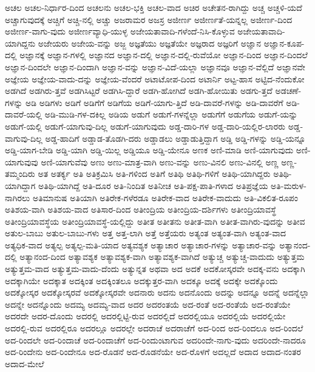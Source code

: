 {ಅಚಲ
ಅಚಲ-ನಿರ್ಧಾರ-ದಿಂದ
ಅಚಲನು
ಅಚಲ-ಭಕ್ತಿ
ಅಚಲ-ವಾದ
ಅಚಿರ
ಅಚೇತನ-ರಾಗಿದ್ದು
ಅಚ್ಚ
ಅಚ್ಚಳಿ-ಯದೆ
ಅಚ್ಚಾಗುವುದಕ್ಕೆ
ಅಚ್ಚಿಗೆ
ಅಚ್ಚಿ-ನಲ್ಲಿ
ಅಚ್ಚು
ಅಜರಾಮರ
ಅಜಸ್ರ
ಅಜೀರ್ಣ
ಅಜೀರ್ಣತೆ-ಯನ್ನಲ್ಲ
ಅಜೀರ್ಣ-ದಿಂದ
ಅಜೀರ್ಣ-ವಾಗು-ವುದು
ಅಜೀರ್ಣವ್ಯಾಧಿ-ಯುಳ್ಳ
ಅಜೇಯತಾವಾದಿ-ಗಳೆಂದೆ-ನಿಸಿ-ಕೊಳ್ಳುವ
ಅಜೇಯತಾವಾದಿ-ಯಾಗಿದ್ದನು
ಅಜೇಯರು
ಅಜೇಯ-ವನ್ನು
ಅಜ್ಜ
ಅಜ್ಞತೆಯು
ಅಜ್ಞತೆಯೇ
ಅಜ್ಞರಾದ
ಅಜ್ಞರಿಗೆ
ಅಜ್ಞಾನ
ಅಜ್ಞಾನ-ಕೂಪ-ದಲ್ಲಿ
ಅಜ್ಞಾನಕ್ಕೆ
ಅಜ್ಞಾನ-ಗಳಲ್ಲಿ
ಅಜ್ಞಾನದ
ಅಜ್ಞಾನ-ದಲ್ಲಿ
ಅಜ್ಞಾನ-ದಲ್ಲಿ-ರುವೆಯೋ
ಅಜ್ಞಾನ-ದಿಂದ
ಅಜ್ಞಾನ-ದಿಂದಲೆ
ಅಜ್ಞಾನ-ದಿಂದಲೇ
ಅಜ್ಞಾನ-ದಿಂದಾಗಿ
ಅಜ್ಞಾನ-ವನ್ನು
ಅಜ್ಞಾನ-ವಿದೆ-ಯಲ್ಲಾ
ಅಜ್ಞಾನವೂ
ಅಜ್ಞಾನ-ವೆಲ್ಲಿದೆ
ಅಜ್ಞಾನವೇ
ಅಜ್ಞೇಯ
ಅಜ್ಞೇಯ-ವಾದು-ದನ್ನು
ಅಜ್ಞೇಯ-ವೆಂದರೆ
ಅಟಾಟೋಪ-ದಿಂದ
ಅಟಾರ್ನಿ
ಅಟ್ಟ-ಹಾಸ
ಅಟ್ಟಿದ-ನೆಂದುಕೋ
ಅಡಗಿದೆ
ಅಡಗಿರು-ತ್ತವೆ
ಅಡಗಿಸಿಟ್ಟರೆ
ಅಡಗಿಸಿ-ದ್ದಾರೆ
ಅಡಗಿ-ಹೋಗಿದೆ
ಅಡಗಿ-ಹೋಯಿತು
ಅಡಗು-ತ್ತದೆ
ಅಡಚಣೆ-ಗಳನ್ನು
ಅಡಿ
ಅಡಿಗಳು
ಅಡಿಗೆ
ಅಡಿಗೆಗೆ
ಅಡಿಗೆಯ
ಅಡಿಗೆ-ಯಾಗು-ತ್ತಿದೆ
ಅಡಿ-ದಾವರೆ-ಗಳನ್ನು
ಅಡಿ-ದಾವರೆಗೆ
ಅಡಿ-ದಾವರೆ-ಯಲ್ಲಿ
ಅಡಿ-ಮುಡಿ-ಗಳ-ದಕಿಲ್ಲ
ಅಡಿಯ
ಅಡುಗೆ
ಅಡುಗೆ-ಗಳನ್ನೆಲ್ಲಾ
ಅಡುಗೆಗೆ
ಅಡುಗೆಯ
ಅಡುಗೆ-ಯನ್ನು
ಅಡುಗೆ-ಯಲ್ಲಿ
ಅಡುಗೆ-ಯಾಗುವು-ದಿಲ್ಲ
ಅಡುಗೆ-ಯಾಗುವುದು
ಅಡ್ಡ-ದಾರಿ-ಗಳ
ಅಡ್ಡ-ದಾರಿ-ಯಲ್ಲಿರ-ಲಾರರು
ಅಡ್ಡ-ವಾಗುವು-ದಿಲ್ಲ
ಅಡ್ಡ-ಹಾದಿಗೆ
ಅಡ್ಡಾಡ-ತೊಡಗಿ-ದರು
ಅಡ್ಡಾಡಲು
ಅಡ್ಡಾಡುತ್ತಿದ್ದಾಗ
ಅಡ್ಡಿ
ಅಡ್ಡಿ-ಗಳನ್ನು
ಅಡ್ಡಿ-ಯನ್ನೂ
ಅಡ್ಡಿ-ಯಾಗ-ಬೇಡಿ
ಅಡ್ಡಿ-ಯಾಗಿ
ಅಡ್ಡಿ-ಯಿಲ್ಲ
ಅಡ್ಡಿಯೂ
ಅಡ್ಡಿ-ಯೇನೂ
ಅಣಕ
ಅಣಿ-ಮಾಡಿ
ಅಣಿ-ಯಾಗುವುದು
ಅಣಿ-ಯಾಗುವುವು
ಅಣಿ-ಯಾಗುವೆವು
ಅಣು
ಅಣು-ಮಾತ್ರ-ವಾಗಿ
ಅಣು-ವನ್ನು
ಅಣು-ವಿನಲಿ
ಅಣು-ವಿನಲ್ಲಿ
ಅಣ್ಣ
ಅಣ್ಣ-ತಮ್ಮಂದಿರು
ಅತ
ಅತರ್ಕ್ಯ
ಅತಿ
ಅತಿಕ್ರಮಿಸಿ
ಅತಿ-ಗಳಿಂದ
ಅತಿಗೆ
ಅತಿಥಿ
ಅತಿಥಿ-ಗಳಿಗೆ
ಅತಿಥಿ-ಯಾಗಿದ್ದರು
ಅತಿಥಿ-ಯಾಗಿದ್ದಾಗ
ಅತಿಥಿ-ಯಾಗಿದ್ದೆ
ಅತಿ-ದೂರ
ಅತಿ-ನಿಂದಿತ
ಅತಿನೀಚ
ಅತಿ-ಪಕ್ಷ-ಪಾತಿ-ಗಳಾದ
ಅತಿಪ್ರಜ್ಞೆಯ
ಅತಿ-ಮರುಳ-ನಾಗಿರಲು
ಅತಿಮಾನುಷ
ಅತಿಯಾಗಿ
ಅತಿರೇಕ-ಗಳೆರಡೂ
ಅತಿರೇಕ-ವಾದ
ಅತಿರೇಕ-ವಾದುದು
ಅತಿ-ವಿಕಲಿತ-ರೂಪಂ
ಅತಿಶಯ-ವಾಗಿ
ಅತಿಶಯ-ವಾದ
ಅತಿಸಾರ-ದಿಂದ
ಅತೀಂದ್ರಿಯ
ಅತೀಂದ್ರಿಯ-ದರ್ಶಿಗಳು
ಅತೀಂದ್ರಿಯಾವಸ್ಥೆ
ಅತೀಂದ್ರಿಯಾವಸ್ಥೆಯ
ಅತೀಂದ್ರಿಯಾವಸ್ಥೆ-ಯಲ್ಲಿದ್ದು
ಅತೀತ
ಅತೀತನು
ಅತೀತ-ವಾಗಿ
ಅತೀತ-ವಾಗಿರು-ವುದನ್ನು
ಅತೀವ
ಅತುಲ-ಬಾಬು
ಅತುಲ-ಬಾಬು-ಗಳು
ಅತ್ತ
ಅತ್ತ-ಲಾಗಿ
ಅತ್ತೆ
ಅತ್ತೆಯರು
ಅತ್ಯಂತ
ಅತ್ಯಂತ-ವಾಗಿ
ಅತ್ಯಂತ-ವಾದ
ಅತ್ಯಧಿಕ-ವಾದ
ಅತ್ಯಲ್ಪ
ಅತ್ಯಲ್ಪ-ಮತಿ-ಯಾದ
ಅತ್ಯವಶ್ಯಕ
ಅತ್ಯಾಚಾರ
ಅತ್ಯಾಚಾರ-ಗಳನ್ನು
ಅತ್ಯಾಚಾರ-ವನ್ನು
ಅತ್ಯಾನಂದ-ದಲ್ಲಿ
ಅತ್ಯಾನಂದ-ದಿಂದ
ಅತ್ಯಾವಶ್ಯಕ
ಅತ್ಯಾವಶ್ಯಕ-ವಾಗಿ
ಅತ್ಯಾವಶ್ಯಕ-ವಾಗಿದೆ
ಅತ್ಯುಚ್ಚ
ಅತ್ಯುಚ್ಚ-ವಾದುದು
ಅತ್ಯುತ್ತಮ
ಅತ್ಯುತ್ತಮ-ವಾದ
ಅತ್ಯುತ್ತಮ-ವಾದು-ದೆಂದು
ಅತ್ಯುನ್ನತ
ಅಥವಾ
ಅದ
ಅದಕೆ
ಅದಕೋಸ್ಕರವೇ
ಅದಕ್ಕ-ವನು
ಅದಕ್ಕಾಗಿ
ಅದಕ್ಕಾಗಿಯೇ
ಅದಕ್ಕಾತ
ಅದಕ್ಕಿಂತ
ಅದಕ್ಕಿಂತಲೂ
ಅದಕ್ಕುತ್ತರ-ವಾಗಿ
ಅದಕ್ಕೂ
ಅದಕ್ಕೆ
ಅದಕ್ಕೇ
ಅದಕ್ಕೊಂದು
ಅದಕ್ಕೋಸ್ಕರ
ಅದಕ್ಕೋಸ್ಕರವೆ
ಅದಕ್ಕೋಸ್ಕರವೇ
ಅದನಾರು
ಅದನು
ಅದನೊಂದು
ಅದನ್ನು
ಅದನ್ನೂ
ಅದನ್ನೆ
ಅದನ್ನೆಲ್ಲಾ
ಅದನ್ನೇ
ಅದನ್ನೊಂದು
ಅದಮ್ಯ
ಅದಮ್ಯ-ವಾದ
ಅದರ
ಅದರಂತಯೆ
ಅದ-ರಂತೆ
ಅದ-ರಂತೆಯೆ
ಅದ-ರಂತೆಯೇ
ಅದರದೇ
ಅದರ-ದೊಂದು
ಅದರಲ್ಲಿ
ಅದರಲ್ಲಿಟ್ಟಿ-ರುವ
ಅದರಲ್ಲಿದೆ
ಅದರಲ್ಲಿಯೂ
ಅದರಲ್ಲಿಯೆ
ಅದರಲ್ಲಿಯೇ
ಅದರಲ್ಲಿ-ರುವ
ಅದರಲ್ಲಿರೂ
ಅದರಲ್ಲೂ
ಅದರಲ್ಲೇ
ಅದರಾಚೆ
ಅದರಾಚೆಗೆ
ಅದ-ರಿಂದ
ಅದ-ರಿಂದಲೂ
ಅದ-ರಿಂದಲೆ
ಅದ-ರಿಂದಲೇ
ಅದ-ರಿಂದಾಚೆ
ಅದ-ರಿಂದಾಚೆಗೆ
ಅದ-ರಿಂದುಂಟಾಗುವ
ಅದರಿಂದೇ-ನಾಗು-ವುದು
ಅದರಿಂದೇ-ನಾದರೂ
ಅದ-ರಿಂದೇನು
ಅದ-ರಿಂದೇನೂ
ಅದ-ರೊಡನೆ
ಅದ-ರೊಡನೆಯೇ
ಅದ-ರೊಳಗೆ
ಅದಲ್ಲದೆ
ಅದಾದ
ಅದಾದ-ನಂತರ
ಅದಾದ-ಮೇಲೆ
}
